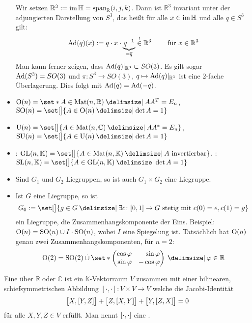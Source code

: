 \begin{itemize}
	Wir setzen $\mathbb{R}^3 := \im \mathbb{H} = \Span_\mathbb{R} (i,j,k)$.
	Dann ist $\mathbb{R}^3$ invariant unter der adjungierten Darstellung von $S^3$, das heißt für alle $x \in \im \mathbb{H}$ und alle $q \in S^3$ gilt:
	\[
		\Ad(q)(x) := q \cdot x \cdot \Underbrace{q^{-1}}{=\overline{q}} \stackrel{!}{\in} \mathbb{R}^3 \qquad \text{ für } x \in \mathbb{R}^3 
	\]
	Man kann ferner zeigen, dass $\Ad(q)|_{\mathbb{R}^3} \subset SO(3)$.
	Es gilt sogar $\Ad(S^3) = SO(3)$ und $\pi \colon S^3 \to SO(3)$, $q \mapsto \Ad(q)|_{\mathbb{R}^3}$ ist eine $2$-fache Überlagerung.
	Dies folgt mit $\Ad(q)=\Ad(-q)$.
	\item {} $\On(n) = \set*{A \in \Mat(n,\mathbb{R}) \given A A^T = E_n}$, $\SO(n) = \set[\big]{A \in \On(n) \given \det A=1}$
	\item {} $\Un(n) = \set[\big]{A \in \Mat (n,\mathbb{C}) \given A A^* =E_n}$, $\SU(n) = \set[\big]{A \in \Un(n) \given \det A=1}$
	\item {}: $\GL(n,\mathbb{K}) = \set[\big]{A \in \Mat(n,\mathbb{K}) \given A \text{ invertierbar}}$. :
	$\SL(n,\mathbb{K}) = \set[\big]{A \in \GL(n,\mathbb{K}) \given \det A =1}$
	\item Sind $G_1$ und $G_2$ Liegruppen, so ist auch $G_1 \times G_2$ eine Liegruppe.
	\item Ist $G$ eine Liegruppe, so ist 
	\[
		G_0 :=  \set[\big]{g \in G \given \exists c \colon [0,1] \to G \text{ stetig mit } c(0)=e, c(1)=g}
	\]
	ein Liegruppe, die Zusammenhangskomponente der Eins.
	Beispiel: $\On(n)=\SO(n) \mathbin{\dot{\cup}} I \cdot \SO(n)$, wobei $I$ eine Spiegelung ist.
	Tatsächlich hat $\On(n)$ genau zwei Zusammenhangskomponenten, für $n=2$:
	\[
		\On(2) = \SO(2) \mathbin{\dot{\cup}} \set*{\begin{pmatrix*}[r]
			\cos \varphi & \sin \varphi \\
			\sin \varphi & - \cos \varphi
		\end{pmatrix*} \given \varphi \in \mathbb{R}}
	\]
\end{itemize}

\begin{definition}[{name=[Lieklammer]}]
	Eine  über $\mathbb{R}$ oder $\mathbb{C}$ ist ein $\mathbb{K}$-Vektorraum $V$ zusammen mit einer bilinearen, schiefsymmetrischen Abbildung 
	\(
		[\cdot ,\cdot ] \colon V \times V \to V
	\)
	welche die Jacobi-Identität 
	\[
		\benbrace[\big]{X, \benbrace*{Y,Z}} + \benbrace[\big]{Z, \benbrace*{X,Y}} + \benbrace[\big]{Y, \benbrace*{Z,X}} =0
	\]
	für alle $X,Y,Z \in V$ erfüllt.
	Man nennt $\benbrace*{\cdot ,\cdot }$ eine . 
\end{definition}

